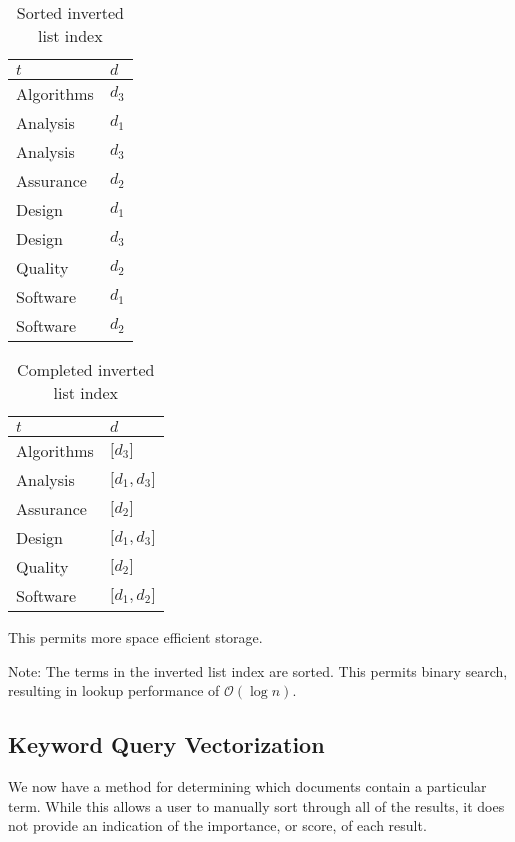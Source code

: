 \begin{ex}
\begin{table}[!ht]
			\begin{tabular}{ll}
				\toprule
				$t$ & $d$ \\
				\midrule
				Algorithms & $d_3$ \\
				Analysis & $d_1$ \\
				Analysis & $d_3$ \\
				Assurance & $d_2$ \\
				Design & $d_1$ \\
				Design & $d_3$ \\
				Quality & $d_2$ \\
				Software & $d_1$ \\
				Software & $d_2$ \\
				\bottomrule
			\end{tabular}
			
			\label{tbl:inverted-list-index-sorted}
			\caption{Sorted inverted list index}
		\end{table}
		
		\begin{table}[!ht]
			\centering
			
			\begin{tabular}{ll}
				\toprule
				$t$ & $d$ \\
				\midrule
				Algorithms & $\lbrack d_3\rbrack$ \\
				Analysis & $\lbrack d_1, d_3\rbrack$ \\
				Assurance & $\lbrack d_2\rbrack$ \\
				Design & $\lbrack d_1, d_3\rbrack$ \\
				Quality & $\lbrack d_2\rbrack$ \\
				Software & $\lbrack d_1, d_2\rbrack$ \\
				\bottomrule
			\end{tabular}
			
			\label{tbl:inverted-list-index-complete}
			\caption{Completed inverted list index}
		\end{table}
		
		This permits more space efficient storage.
		
		Note:  The terms in the inverted list index are sorted.  This permits binary search, resulting in lookup performance of $\mathcal{O}\left(\log{n}\right)$.
	\end{ex}
	
	\subsection{Keyword Query Vectorization}
		We now have a method for determining which documents contain a particular term.  While this allows a user to manually sort through all of the results, it does not provide an indication of the importance, or score, of each result.
		
